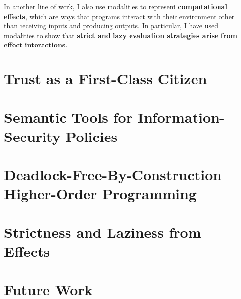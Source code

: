 \documentclass{article}
\theoremstyle{definition}
\begin{document}
In another line of work, I also use modalities to represent \textbf{computational effects}, which are ways that programs interact with their environment other than receiving inputs and producing outputs.
In particular, I have used modalities to show that \textbf{strict and lazy evaluation strategies arise from effect interactions.}

\section*{Trust as a First-Class Citizen}



\section*{Semantic Tools for Information-Security Policies}

\section*{Deadlock-Free-By-Construction Higher-Order Programming}

\section*{Strictness and Laziness from Effects}

\section*{Future Work}



\end{document}
